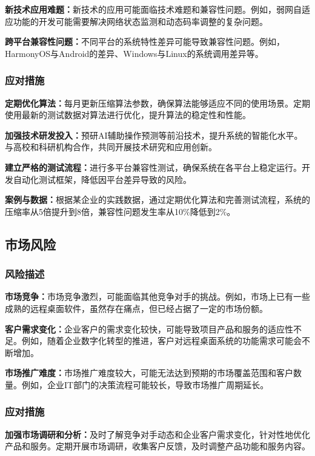 \documentclass[12pt,a4paper]{article}
\begin{document}
\textbf{新技术应用难题：}新技术的应用可能面临技术难题和兼容性问题。例如，弱网自适应功能的开发可能需要解决网络状态监测和动态码率调整的复杂问题。

\textbf{跨平台兼容性问题：}不同平台的系统特性差异可能导致兼容性问题。例如，HarmonyOS与Android的差异、Windows与Linux的系统调用差异等。

\subsubsection{应对措施}
\textbf{定期优化算法：}每月更新压缩算法参数，确保算法能够适应不同的使用场景。定期使用最新的测试数据对算法进行优化，提升算法的稳定性和性能。

\textbf{加强技术研发投入：}预研AI辅助操作预测等前沿技术，提升系统的智能化水平。与高校和科研机构合作，共同开展技术研究和应用创新。

\textbf{建立严格的测试流程：}进行多平台兼容性测试，确保系统在各平台上稳定运行。开发自动化测试框架，降低因平台差异导致的风险。

\textbf{案例与数据：}根据某企业的实践数据，通过定期优化算法和完善测试流程，系统的压缩率从5倍提升到8倍，兼容性问题发生率从10\%降低到2\%。


\subsection{市场风险}

\subsubsection{风险描述}
\textbf{市场竞争：}市场竞争激烈，可能面临其他竞争对手的挑战。例如，市场上已有一些成熟的远程桌面软件，虽然存在痛点，但已经占据了一定的市场份额。

\textbf{客户需求变化：}企业客户的需求变化较快，可能导致项目产品和服务的适应性不足。例如，随着企业数字化转型的推进，客户对远程桌面系统的功能需求可能会不断增加。

\textbf{市场推广难度：}市场推广难度较大，可能无法达到预期的市场覆盖范围和客户数量。例如，企业IT部门的决策流程可能较长，导致市场推广周期延长。

\subsubsection{应对措施}
\textbf{加强市场调研和分析：}及时了解竞争对手动态和企业客户需求变化，针对性地优化产品和服务。定期开展市场调研，收集客户反馈，及时调整产品功能和服务内容。
\end{document}
